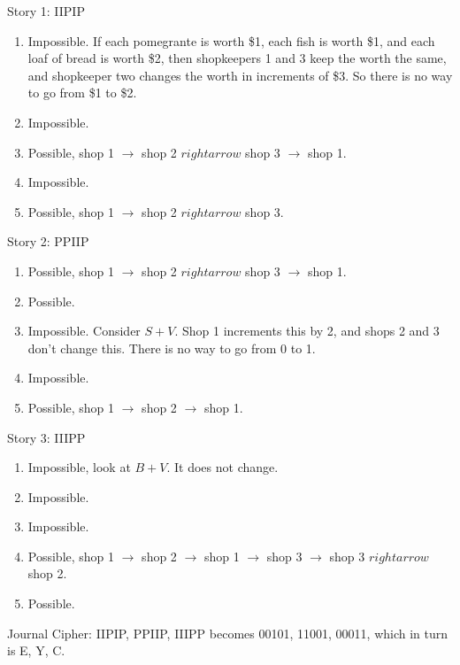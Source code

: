 Story 1:  IIPIP
\begin{enumerate}
\item Impossible. If each pomegrante is worth \$1, each fish is worth \$1, and each loaf of bread is worth \$2, then shopkeepers 1 and 3 keep the worth the same, and shopkeeper two changes the worth in increments of \$3. So there is no way to go from \$1 to \$2.
\item Impossible.
\item Possible, shop 1 \(\rightarrow\) shop 2 \(rightarrow\) shop 3 \(\rightarrow\) shop 1.
\item Impossible.
\item Possible, shop 1 \(\rightarrow\) shop 2 \(rightarrow\) shop 3.
\end{enumerate}

Story 2: PPIIP
\begin{enumerate}
\item Possible, shop 1 \(\rightarrow\) shop 2 \(rightarrow\) shop 3 \(\rightarrow\) shop 1.
\item Possible.
\item Impossible. Consider \(S + V\). Shop 1 increments this by 2, and shops 2 and 3 don't change this. There is no way to go from 0 to 1.
\item Impossible.
\item Possible, shop 1 \(\rightarrow\) shop 2 \(\rightarrow\) shop 1.
\end{enumerate}

Story 3: IIIPP
\begin{enumerate}
\item Impossible, look at \(B + V\). It does not change.
\item Impossible.
\item Impossible.
\item Possible, shop 1 \(\rightarrow\) shop 2 \(\rightarrow\) shop 1 \(\rightarrow\) shop 3 \(\rightarrow\) shop 3 \(rightarrow\) shop 2.
\item Possible.
\end{enumerate}

Journal Cipher: IIPIP, PPIIP, IIIPP becomes 00101, 11001, 00011, which in turn is E, Y, C.